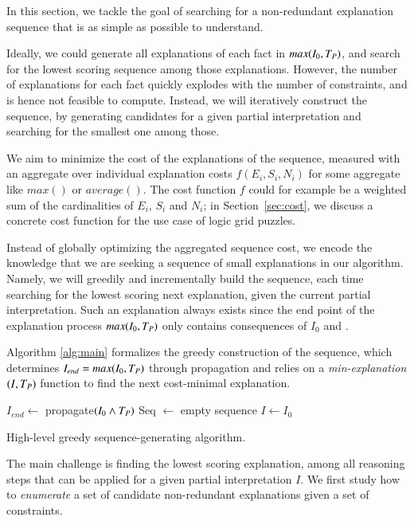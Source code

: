 In this section, we tackle the goal of searching for a non-redundant explanation sequence that is as simple as possible to understand.

Ideally, we could generate all explanations of each fact in $max(I_0,T_P)$, and search for the lowest scoring sequence among those explanations. However, the number of explanations for each fact quickly explodes with the number of constraints, and is hence not feasible to compute. Instead, we will iteratively construct the sequence, by generating candidates for a given partial interpretation and searching for the smallest one among those.

We aim to minimize the cost of the explanations of the sequence, measured with an aggregate over individual explanation costs $f(E_i, S_i, N_i)$ for some aggregate like $max()$ or $average()$. The cost function $f$ could for example be a weighted sum of the cardinalities of $E_i$, $S_i$ and $N_i$; in Section~\ref{sec:cost}, we discuss a concrete cost function for the use case of logic grid puzzles.

Instead of globally optimizing the aggregated sequence cost, we encode the knowledge that we are seeking a sequence of small explanations in our algorithm. Namely, we will greedily and incrementally build the sequence, each time searching for the lowest scoring next explanation, given the current partial interpretation. Such an explanation always exists since the end point of the explanation process $max(I_0,T_P)$ only contains consequences of $I_0$ and \allconstraints.

Algorithm \ref{alg:main} formalizes the greedy construction of the sequence, which determines $I_{end} = max(I_0,T_P)$  through propagation and relies on a \textit{min-explanation$(I,T_P)$} function to find the next cost-minimal explanation.

\begin{algorithm}
  $I_{end} \gets$ propagate$(I_0\land T_P)$\;
  Seq $\gets$ empty sequence\;
  $I \gets I_0$\;
  \caption{High-level greedy sequence-generating algorithm.}
  \label{alg:main}
\end{algorithm}
The main challenge is finding the lowest scoring explanation, among all reasoning steps that can be applied for a given partial interpretation $I$. We first study how to \textit{enumerate} a set of candidate non-redundant explanations given a set of constraints.

